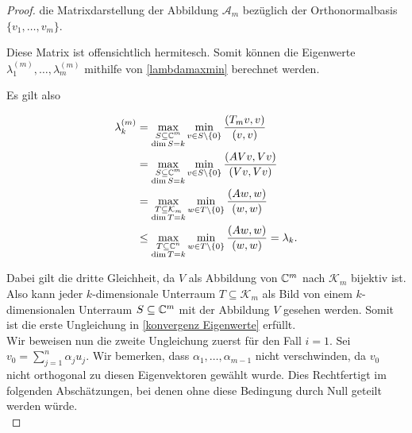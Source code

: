 \documentclass{article}
\begin{document}
\begin{theorem}
\begin{proof}
	die Matrixdarstellung der Abbildung $\mathcal{A}_m$ bezüglich der Orthonormalbasis $\{v_1,\dots,v_m\}$.

	Diese Matrix ist offensichtlich hermitesch. Somit können die Eigenwerte $\lambda_1^{(m)}, \dots, \lambda_m^{(m)}$ mithilfe von \eqref{lambdamaxmin} berechnet werden.

	Es gilt also

	\begin{equation}
		\label{Eigenwert_Ungl}
		\begin{aligned}
			\lambda_k^{(m)} &= \max_{\substack{S \subseteq \mathbb{C}^m\\ \dim S = k}} \min_{v\in S\setminus\{0\}} \frac{(T_m v,v)}{(v,v)} \\
			&= \max_{\substack{S \subseteq \mathbb{C}^m\\ \dim S = k}} \min_{v\in S\setminus\{0\}} \frac{(AVv,Vv)}{(Vv,Vv)}\\
			&= \max_{\substack{T \subseteq \mathcal{K}_m \\ \dim T = k}} \min_{w\in T\setminus\{0\}} \frac{(Aw,w)}{(w,w)}\\
			 &\le \max_{\substack{T \subseteq \mathbb{C}^n\\ \dim T = k}} \min_{w\in T\setminus\{0\}} \frac{(Aw,w)}{(w,w)} = \lambda_k.
		\end{aligned}
	\end{equation}

	Dabei gilt die dritte Gleichheit, da $V$ als Abbildung von $\mathbb{C}^m$ nach $\mathcal{K}_m$ bijektiv ist. Also kann jeder $k$-dimensionale Unterraum $T \subseteq \mathcal{K}_m$ als Bild von einem $k$-dimensionalen Unterraum $S \subseteq \mathbb{C}^m$ mit der Abbildung $V$ gesehen werden.
	Somit ist die erste Ungleichung in \eqref{konvergenz Eigenwerte} erfüllt.\\

	Wir beweisen nun die zweite Ungleichung zuerst für den Fall $i = 1$.
	Sei $v_0 = \sum_{j=1}^{n}\alpha_j u_j$. Wir bemerken, dass $\alpha_1, \dots, \alpha_{m-1}$ nicht verschwinden, da $v_0$ nicht orthogonal zu diesen Eigenvektoren gewählt wurde. Dies Rechtfertigt im folgenden Abschätzungen, bei denen ohne diese Bedingung durch Null geteilt werden würde.\\


\end{proof}
\end{theorem}
\end{document}
